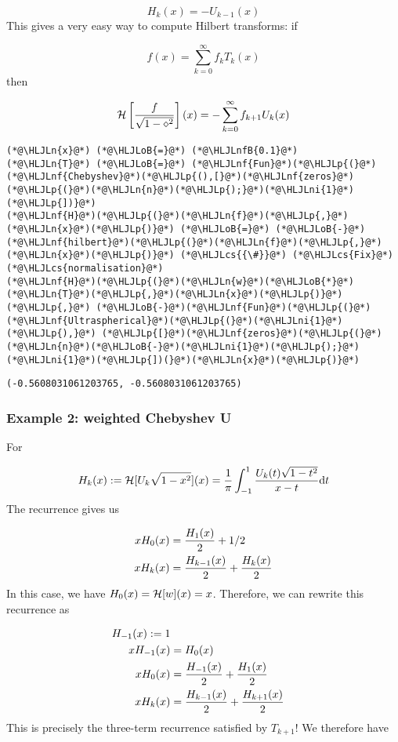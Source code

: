 \documentclass[12pt,a4paper]{article}
\newcommand{\HLJLn}[1]{#1}
\newcommand{\HLJLnf}[1]{\textcolor[RGB]{66,102,213}{#1}}
\newcommand{\HLJLnfB}[1]{\textcolor[RGB]{59,151,46}{#1}}
\newcommand{\HLJLni}[1]{\textcolor[RGB]{59,151,46}{#1}}
\newcommand{\HLJLoB}[1]{\textcolor[RGB]{102,102,102}{\textbf{#1}}}
\newcommand{\HLJLp}[1]{#1}
\newcommand{\HLJLcs}[1]{\textcolor[RGB]{153,153,119}{\textit{#1}}}
\def\D{ {\rm d} }
\def\HH{ {\cal H} }
\def\dt{\D t}
\begin{document}
\[
H_k(x) = -U_{k-1}(x)
\]
This gives a very easy way to compute Hilbert transforms: if

\[
f(x) = \sum_{k=0}^\infty f_k T_k(x)
\]
then

\[
\HH\left[{f \over \sqrt{1-\diamond^2}}\right](x) = -\sum_{k=0}^\infty f_{k+1} U_k(x)
\]

\begin{lstlisting}
(*@\HLJLn{x}@*) (*@\HLJLoB{=}@*) (*@\HLJLnfB{0.1}@*)
(*@\HLJLn{T}@*) (*@\HLJLoB{=}@*) (*@\HLJLnf{Fun}@*)(*@\HLJLp{(}@*)(*@\HLJLnf{Chebyshev}@*)(*@\HLJLp{(),[}@*)(*@\HLJLnf{zeros}@*)(*@\HLJLp{(}@*)(*@\HLJLn{n}@*)(*@\HLJLp{);}@*)(*@\HLJLni{1}@*)(*@\HLJLp{])}@*)
(*@\HLJLnf{H}@*)(*@\HLJLp{(}@*)(*@\HLJLn{f}@*)(*@\HLJLp{,}@*)(*@\HLJLn{x}@*)(*@\HLJLp{)}@*) (*@\HLJLoB{=}@*) (*@\HLJLoB{-}@*)(*@\HLJLnf{hilbert}@*)(*@\HLJLp{(}@*)(*@\HLJLn{f}@*)(*@\HLJLp{,}@*)(*@\HLJLn{x}@*)(*@\HLJLp{)}@*) (*@\HLJLcs{{\#}}@*) (*@\HLJLcs{Fix}@*) (*@\HLJLcs{normalisation}@*)
(*@\HLJLnf{H}@*)(*@\HLJLp{(}@*)(*@\HLJLn{w}@*)(*@\HLJLoB{*}@*)(*@\HLJLn{T}@*)(*@\HLJLp{,}@*)(*@\HLJLn{x}@*)(*@\HLJLp{)}@*) (*@\HLJLp{,}@*) (*@\HLJLoB{-}@*)(*@\HLJLnf{Fun}@*)(*@\HLJLp{(}@*)(*@\HLJLnf{Ultraspherical}@*)(*@\HLJLp{(}@*)(*@\HLJLni{1}@*)(*@\HLJLp{),}@*) (*@\HLJLp{[}@*)(*@\HLJLnf{zeros}@*)(*@\HLJLp{(}@*)(*@\HLJLn{n}@*)(*@\HLJLoB{-}@*)(*@\HLJLni{1}@*)(*@\HLJLp{);}@*)(*@\HLJLni{1}@*)(*@\HLJLp{])(}@*)(*@\HLJLn{x}@*)(*@\HLJLp{)}@*)
\end{lstlisting}

\begin{lstlisting}
(-0.5608031061203765, -0.5608031061203765)
\end{lstlisting}


\subsubsection{Example 2: weighted Chebyshev U}
For

\[
H_k(x) := \HH[U_k \sqrt{1-x^2}](x) =  {1 \over \pi} \int_{-1}^1 {U_k(t) \sqrt{1-t^2} \over x-t} \dt
\]
The recurrence gives us


\begin{align*}
x H_0(x) &= {H_1(x) \over 2} + 1/2 \\
x H_k(x) &= {H_{k-1}(x) \over 2} + {H_k(x) \over 2} \\
\end{align*}
In this case, we have $H_0(x) = \HH[w](x) =  x$. Therefore, we can rewrite this recurrence as


\begin{align*}
H_{-1}(x) := 1 \\
 xH_{-1}(x)  &= H_0(x) \\
x H_0(x) &= {H_{-1}(x) \over 2} + {H_1(x) \over 2} \\
x H_k(x) &= {H_{k-1}(x) \over 2} + {H_{k+1}(x) \over 2}
\end{align*}
This is precisely the three-term recurrence satisfied by $T_{k+1}$! We therefore have
\end{document}
